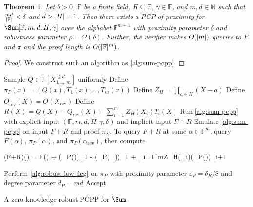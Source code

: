 \documentclass[english,12pt]{reedthesis}
\theoremstyle{plain}
\newtheorem{thm}{Theorem}[section]
\theoremstyle{definition}
\theoremstyle{remark}
\DeclarePairedDelimiter{\abs}{\lvert}{\rvert}
\begin{document}
\begin{thm}
  Let $\delta > 0$, $\mathbb{F}$ be a finite field, $H \subseteq \mathbb{F}$,
  $\gamma \in \mathbb{F}$, and $m, d \in \mathbb{N}$ such that $\frac{md}{\abs{\mathbb{F}}} < \delta$
  and $d > \abs{H} + 1$. Then there exists a PCP of
  proximity for $\Sum[\mathbb{F}, m, d, H, \gamma]$ over the alphabet
  $\mathbb{F}^{m+1}$ with proximity parameter $\delta$ and robustness parameter
  $\rho = \Omega(\delta)$. Further, the verifier makes $O(\abs{m})$ queries to $F$ and $\pi$
  and the proof length is $O(\abs{\mathbb{F}}^{m})$.
\end{thm}

\begin{proof}
  We construct such an algorithm as \cref{alg:sum-pcpp}. %
\end{proof}

\begin{algorithm}[htbp]
  Sample $Q \in \mathbb{F}[X_{1, \ldots, m}^{\le d}]$ uniformly\;
  Define $\pi_{P}(x) = (Q(x), T_{1}(x), \ldots, T_{m}(x))$\;
  Define $Z_{H} = \prod_{a \in H}(X - a)$\;
  Define $Q_{\text{rev}}(X) = Q(X_{\text{rev}})$\; %
  Define $R(X) = Q(X) - Q_{\text{rev}}(X) + \sum_{i=1}^{m}Z_{H}(X_{i})T_{i}(X)$\;
  Run \cref{alg:sum-pcpp} with explicit input $(\mathbb{F}, m, d, H, \gamma, \delta)$ and
  implicit input $F + R$\;
  \;
  Emulate \cref{alg:sum-pcpp} on input $F + R$ and proof $\pi_{\Sigma}$. To query
  $F + R$ at some $\alpha \in \mathbb{F}^{m}$, query $F(\alpha)$, $\pi_{P}(\alpha)$, and
  $\pi_{P}(\alpha_{\text{rev}})$, then compute
  \begin{algomathdisplay}
    (F+R)(\alpha) = F(\alpha) + (\pi_{P}(\alpha))_{1} - (\pi_{P}(\alpha_{}))_{1} + \sum_{i=1}^{m}Z_{H}(\alpha_{i})(\pi_{P}(\alpha))_{i+1}
  \end{algomathdisplay}
  Perform \cref{alg:robust-low-deg} on $\pi_{P}$ with proximity parameter
  $\varepsilon_{P} = \delta_{R}/8$ and degree parameter $d_{P} = md$\;
  Accept\;
  \caption{A zero-knowledge robust PCPP for $\Sum$~\cite[Construction
    5.2]{GOS25}}\label{alg:sum-pzk-pcpp}
\end{algorithm}
\end{document}
